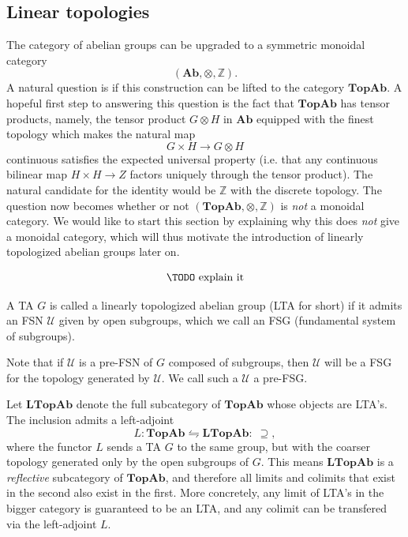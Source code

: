 \subsection{Linear topologies}

The category of abelian groups can be upgraded to a symmetric monoidal category $$(\textbf{Ab}, \otimes, \mathbb{Z}).$$
A natural question is if this construction can be lifted to the category $\textbf{TopAb}$. A hopeful first step to answering this question is the fact that $\textbf{TopAb}$ has tensor products, namely, the tensor product $G \otimes H$ in $\textbf{Ab}$ equipped with the finest topology which makes the natural map
\[G \times H \rightarrow G \otimes H\]
continuous satisfies the expected universal property (i.e. that any continuous bilinear map $H \times H \rightarrow Z$ factors uniquely through the tensor product). The natural candidate for the identity would be $\mathbb{Z}$ with the discrete topology. The question now becomes whether or not $(\textbf{TopAb}, \otimes, \mathbb{Z})$ is \emph{not} a monoidal category. We would like to start this section by explaining why this does \emph{not} give a monoidal category, which will thus motivate the introduction of linearly topologized abelian groups later on.

\[\text{\TODO explain it}\]

\begin{definition} A TA $G$ is called a linearly topologized abelian group (LTA for short) if it admits an FSN $\mathcal{U}$ given by open subgroups, which we call an FSG (fundamental system of subgroups).
\end{definition}

\begin{remark} Note that if $\mathcal{U}$ is a pre-FSN of $G$ composed of subgroups, then $\mathcal{U}$ will be a FSG for the topology generated by $\mathcal{U}$. We call such a $\mathcal{U}$ a pre-FSG.
\end{remark}

\noindent Let $\textbf{LTopAb}$ denote the full subcategory of $\textbf{TopAb}$ whose objects are LTA's. The inclusion admits a left-adjoint
\begin{equation}
    L : \textbf{TopAb} \leftrightharpoons \textbf{LTopAb} : \; \supseteq,
\end{equation}
where the functor $L$ sends a TA $G$ to the same group, but with the coarser topology generated only by the open subgroups of $G$. This means $\textbf{LTopAb}$ is a \emph{reflective} subcategory of $\textbf{TopAb}$, and therefore all limits and colimits that exist in the second also exist in the first. More concretely, any limit of LTA's in the bigger category is guaranteed to be an LTA, and any colimit can be transfered via the left-adjoint $L$.

